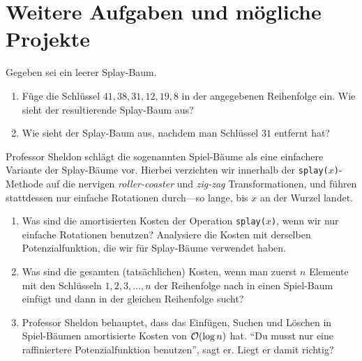 \documentclass{uebung_cs}
\begin{document}
\section*{Weitere Aufgaben und mögliche Projekte}

\begin{exercise}
    Gegeben sei ein leerer Splay-Baum.
    \begin{enumerate}
        \item Füge die Schlüssel $41,38,31,12,19,8$ in der angegebenen Reihenfolge ein. Wie sieht der resultierende Splay-Baum aus?
        \item Wie sieht der Splay-Baum aus, nachdem man Schlüssel $31$ entfernt hat?
    \end{enumerate}
\end{exercise}

\begin{exercise}
    Professor Sheldon schlägt die sogenannten Spiel-Bäume als eine einfachere Variante der Splay-Bäume vor. Hierbei verzichten wir innerhalb der \texttt{splay($x$)}-Methode auf die nervigen \emph{roller-coaster} und \emph{zig-zag} Transformationen, und führen stattdessen nur einfache Rotationen durch---so lange, bis $x$ an der Wurzel landet.
    \begin{enumerate}
        \item{}\mittel Was sind die amortisierten Kosten der Operation \texttt{splay($x$)}, wenn wir nur einfache Rotationen benutzen? Analysiere die Kosten mit derselben Potenzialfunktion, die wir für Splay-Bäume verwendet haben.
        \item{}\mittel Was sind die gesamten (tatsächlichen) Kosten, wenn man zuerst $n$ Elemente mit den Schlüsseln $1,2,3,\dots,n$ der Reihenfolge nach in einen Spiel-Baum einfügt und dann in der gleichen Reihenfolge sucht?
        \item{}\note Professor Sheldon behauptet, dass das Einfügen, Suchen und Löschen in Spiel-Bäumen amortisierte Kosten von $\mathcal{O}(\log n)$ hat. \enquote{Du musst nur eine raffiniertere Potenzialfunktion benutzen}, sagt er. Liegt er damit richtig?
    \end{enumerate}
\end{exercise}
\end{document}
